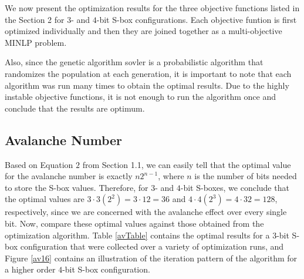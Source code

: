 \documentclass[11pt]{article}
\begin{document}
We now present the optimization results for the three objective functions listed in the Section 2 for $3$- and $4$-bit S-box configurations. Each objective funtion is first optimized individually and then they are joined together as a multi-objective MINLP problem. 

Also, since the genetic algorithm sovler is a probabilistic algorithm that randomizes the population at each generation, it is important to note that each algorithm was run many times to obtain the optimal results. Due to the highly instable objective functions, it is not enough to run the algorithm once and conclude that the results are optimum. 

\subsection{Avalanche Number}


Based on Equation $2$ from Section 1.1, we can easily tell that the optimal value for the avalanche number is exactly $n2^{n-1}$, where $n$ is the number of bits needed to store the S-box values. Therefore, for $3$- and $4$-bit S-boxes, we conclude that the optimal values are $3 \cdot 3(2^2) = 3 \cdot 12 = 36$ and $4 \cdot 4(2^3) = 4 \cdot 32 = 128$, respectively, since we are concerned with the avalanche effect over every single bit. Now, compare these optimal values against those obtained from the optimization algorithm. Table \ref{avTable} contains the optimal results for a $3$-bit S-box configuration that were collected over a variety of optimization runs, and Figure \ref{av16} contains an illustration of the iteration pattern of the algorithm for a higher order $4$-bit S-box configuration.
\end{document}
